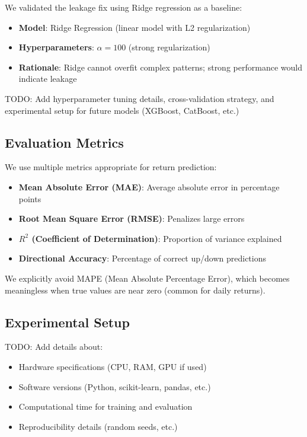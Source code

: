\documentclass[conference]{IEEEtran}
\begin{document}
We validated the leakage fix using Ridge regression as a baseline:

\begin{itemize}
    \item \textbf{Model}: Ridge Regression (linear model with L2 regularization)
    \item \textbf{Hyperparameters}: $\alpha = 100$ (strong regularization)
    \item \textbf{Rationale}: Ridge cannot overfit complex patterns; strong performance would indicate leakage
\end{itemize}

TODO: Add hyperparameter tuning details, cross-validation strategy, and experimental setup for future models (XGBoost, CatBoost, etc.)

\subsection{Evaluation Metrics}

We use multiple metrics appropriate for return prediction:

\begin{itemize}
    \item \textbf{Mean Absolute Error (MAE)}: Average absolute error in percentage points
    \item \textbf{Root Mean Square Error (RMSE)}: Penalizes large errors
    \item \textbf{$R^2$ (Coefficient of Determination)}: Proportion of variance explained
    \item \textbf{Directional Accuracy}: Percentage of correct up/down predictions
\end{itemize}

We explicitly avoid MAPE (Mean Absolute Percentage Error), which becomes meaningless when true values are near zero (common for daily returns).

\subsection{Experimental Setup}

TODO: Add details about:
\begin{itemize}
    \item Hardware specifications (CPU, RAM, GPU if used)
    \item Software versions (Python, scikit-learn, pandas, etc.)
    \item Computational time for training and evaluation
    \item Reproducibility details (random seeds, etc.)
\end{itemize}
\end{document}
